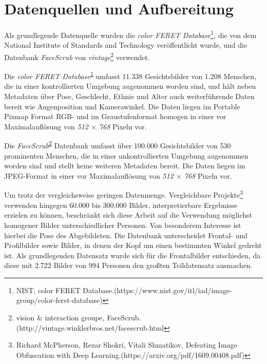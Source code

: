 \section{Datenquellen und Aufbereitung}

Als grundlegende Datenquelle wurden die
\textit{color FERET Database}\footnote{NIST, color FERET Database.\newline(https://www.nist.gov/itl/iad/image-group/color-feret-database)\label{footnote:color-feret}},
die von dem National Institute of Standards and Technology veröffentlicht wurde, und die
Datenbank \textit{FaceScrub} von \textit{vintage}\footnote{vision \& interaction groupe, FaceScrub.\newline(http://vintage.winklerbros.net/facescrub.html\label{footnote:face-scrub}} verwendet.

Die \textit{color FERET Database}\textsuperscript{\ref{footnote:color-feret}} umfasst 11.338 Gesichtsbilder von 1.208 Menschen, die in einer kontrollierten Umgebung augenommen worden sind, und
hält neben Metadaten über Pose, Geschlecht, Ethnie und Alter auch weiterführende Daten bereit wie Augenposition und
Kamerawinkel. Die Daten liegen im Portable Pixmap Format RGB- und im Graustufenformat homogen in einer vor Maximalauflösung von \textit{512 \(\times\) 768} Pixeln vor.

Die \textit{FaceScrub}\textsuperscript{\ref{footnote:face-scrub}} Datenbank umfasst über 100.000 Gesichtsbilder von 530 prominenten Menschen, die in einer unkontrollierten Umgebung augenommen worden sind und stellt keine
weiteren Metadaten bereit. Die Daten liegen im JPEG-Format in einer vor Maximalauflösung von \textit{512 \(\times\) 768} Pixeln vor.


Um trotz der vergleichsweise geringen Datenmenge. Vergleichbare Projekte\footnote{Richard McPherson, Rezar Shokri, Vitali Shmatikov, Defeating Image Obfuscation with Deep Learning.\newline(https://arxiv.org/pdf/1609.00408.pdf)}
verwenden hingegen 60.000 bis 300.000 Bilder, interpretierbare Ergebnisse erzielen zu können, beschränkt sich diese Arbeit auf
die Verwendung möglichst homogener Bilder unterschiedlicher Personen. Von besonderem Interesse ist hierbei die Pose des
Abgebildeten. Die Datenbank unterscheidet Frontal- und Profilbilder sowie Bilder, in denen der Kopf um einen bestimmten
Winkel gedreht ist. Als grundlegenden Datensatz wurde sich für die Frontalbilder entschieden, da diese mit 2.722 Bilder
von 994 Personen den großten Teildatensatz ausmachen.

